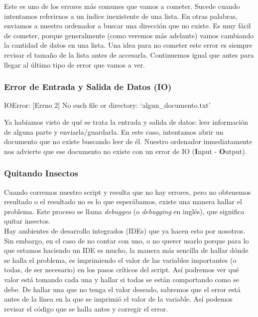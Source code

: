 \documentclass[10pt,letterpaper]{article}
\newenvironment{Code}
{
\begin{lrbox}{\selvestebox}%
\begin{minipage}{\dimexpr\columnwidth-2\fboxsep\relax}
\fontfamily{\ttdefault}\selectfont
}
{\end{minipage}\end{lrbox}%
\begin{center}
\colorbox{light-gray}{\usebox{\selvestebox}}
\end{center}
}
\begin{document}
Este es uno de los errores m\'as comunes que vamos a cometer. Sucede cuando intentamos referirnos a un \'indice inexistente de una lista. En otras palabras, enviamos a nuestro ordenador a buscar una direcci\'on que no existe. Es muy f\'acil de cometer, porque generalmente (como veremos m\'as adelante) vamos cambiando la cantidad de datos en una lista. Una idea para no cometer este error es siempre revisar el tama\~no de la lista antes de accesarla. Continuemos igual que antes para llegar al \'ultimo tipo de error que vamos a ver.

\subsubsection{Error de Entrada y Salida de Datos (IO)}

\begin{Code}
{\color{red} IOError: [Errno 2] No such file or directory: `algun\_documento.txt'}
\end{Code}

Ya hab\'iamos visto de qu\'e se trata la entrada y salida de datos: leer informaci\'on de alguna parte y enviarla/guardarla. En este caso, intentamos abrir un documento que no existe buscando leer de \'el. Nuestro ordenador inmediatamente nos advierte que ese documento no existe con un error de IO (\textbf{I}nput - \textbf{O}utput).

\subsubsection{Quitando Insectos}
Cuando corremos nuestro script y resulta que no hay errores, pero no obtenemos resultado o el resultado no es lo que esper\'abamos, existe una manera hallar el problema. Este proceso se llama \emph{debuggeo} (o \emph{debugging} en ingl\'es), que significa quitar insectos.\\

Hay ambientes de desarrollo integrados (IDEs) que ya hacen esto por nosotros. Sin embargo, en el caso de no contar con uno, o no querer usarlo porque para lo que estamos haciendo un IDE es mucho, la manera m\'as sencilla de hallar d\'onde se halla el problema, es imprimiendo el valor de las variables importantes (o todas, de ser necesario) en los pasos cr\'iticos del script. As\'i podremos ver qu\'e valor est\'a tomando cada una y hallar si todas se est\'an comportando como se debe. De hallar una que no tenga el valor deseado, sabremos que el error est\'a antes de la l\'inea en la que se imprimi\'o el valor de la variable. As\'i podemos revisar el c\'odigo que se halla antes y corregir el error.
\end{document}
